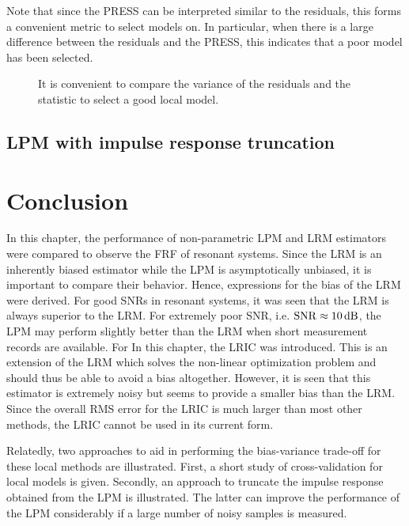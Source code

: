 Note that since the \gls{PRESS} can be interpreted similar to the residuals, this forms a convenient metric to select models on.
In particular, when there is a large difference between the residuals and the \gls{PRESS}, this indicates that a poor model has been selected.

\begin{figure}
  \centering
  \setlength{\figurewidth}{0.85\columnwidth}
  \setlength{\figureheight}{0.62\figurewidth}
  \caption[Output spectrum for local modeling, together the PRESS statistic]{It is convenient to compare the variance of the residuals and the  statistic to select a good local model.}
  \label{fig:nparam:PRESS}
\end{figure}

\subsection{LPM with impulse response truncation}


\section{Conclusion}
\label{sec:conclusion}
In this chapter, the performance of non-parametric \gls{LPM} and \gls{LRM} estimators were compared to observe the \gls{FRF} of resonant systems.
Since the \gls{LRM} is an inherently biased estimator while the \gls{LPM} is asymptotically unbiased, it is important to compare their behavior.
Hence, expressions for the bias of the \gls{LRM} were derived.
For good \glspl{SNR} in resonant systems, it was seen that the \gls{LRM} is always superior to the \gls{LRM}.
For extremely poor \gls{SNR}, i.e. $\mathrm{SNR} \approx 10\,\mathrm{dB}$, the \gls{LPM} may perform slightly better than the \gls{LRM} when short measurement records are available.
For
In this chapter, the \gls{LRIC} was introduced.
This is an extension of the \gls{LRM} which solves the non-linear optimization problem and should thus be able to avoid a bias altogether.
However, it is seen that this estimator is extremely noisy but seems to provide a smaller bias than the \gls{LRM}.
Since the overall \gls{RMS} error for the \gls{LRIC} is much larger than most other methods, the \gls{LRIC} cannot be used in its current form.

Relatedly, two approaches to aid in performing the bias-variance trade-off for these local methods are illustrated.
First, a short study of cross-validation for local models is given.
Secondly, an approach to truncate the impulse response obtained from the \gls{LPM} is illustrated.
The latter can improve the performance of the \gls{LPM} considerably if a large number of noisy samples is measured.


% 

